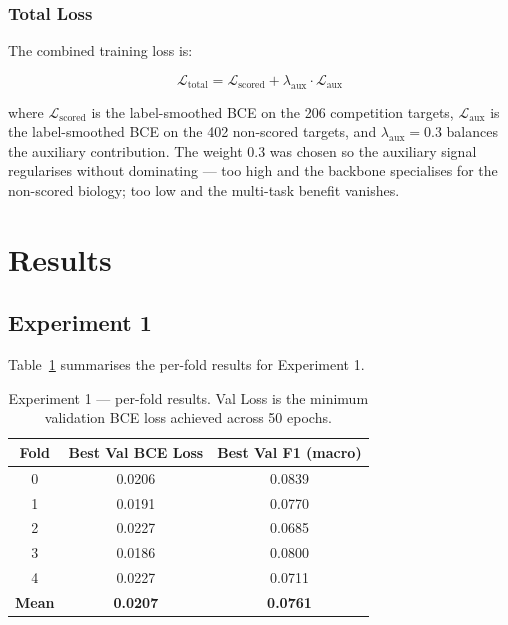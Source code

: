 \documentclass[12pt, a4paper]{article}
\begin{document}
\subsubsection{Total Loss}

The combined training loss is:

\begin{equation}
\mathcal{L}_{\text{total}} = \mathcal{L}_{\text{scored}} + \lambda_{\text{aux}} \cdot \mathcal{L}_{\text{aux}}
\end{equation}

where $\mathcal{L}_{\text{scored}}$ is the label-smoothed BCE on the 206 competition targets, $\mathcal{L}_{\text{aux}}$ is the label-smoothed BCE on the 402 non-scored targets, and $\lambda_{\text{aux}} = 0.3$ balances the auxiliary contribution. The weight 0.3 was chosen so the auxiliary signal regularises without dominating — too high and the backbone specialises for the non-scored biology; too low and the multi-task benefit vanishes.

\section{Results}

\subsection{Experiment 1}

Table~\ref{tab:exp1_results} summarises the per-fold results for Experiment 1.

\begin{table}[h!]
\centering
\caption{Experiment 1 — per-fold results. Val Loss is the minimum validation BCE loss achieved across 50 epochs.}
\label{tab:exp1_results}
\begin{tabular}{ccc}
\toprule
\textbf{Fold} & \textbf{Best Val BCE Loss} & \textbf{Best Val F1 (macro)} \\
\midrule
0 & 0.0206 & 0.0839 \\
1 & 0.0191 & 0.0770 \\
2 & 0.0227 & 0.0685 \\
3 & 0.0186 & 0.0800 \\
4 & 0.0227 & 0.0711 \\
\midrule
\textbf{Mean} & \textbf{0.0207} & \textbf{0.0761} \\
\bottomrule
\end{tabular}
\end{table}
\end{document}
